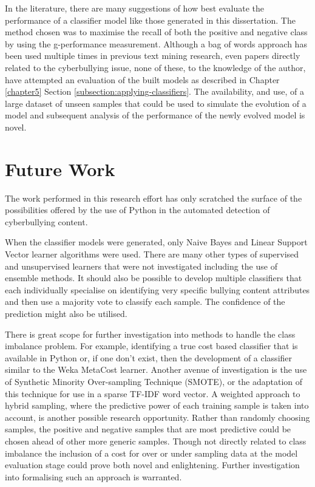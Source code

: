 In the literature, there are many suggestions of how best evaluate the performance of a classifier model like those generated in this dissertation. The method chosen was to maximise the recall of both the positive and negative class by using the g-performance measurement. Although a bag of words approach has been used multiple times in previous text mining research, even papers directly related to the cyberbullying issue, none of these, to the knowledge of the author, have attempted an evaluation of the built models as described in Chapter \ref{chapter5} Section \ref{subsection:applying-classifiers}. The availability, and use, of a large dataset of unseen samples that could be used to simulate the evolution of a model and subsequent analysis of the performance of the newly evolved model is novel.


\section{Future Work}

The work performed in this research effort has only scratched the surface of the possibilities offered by the use of Python in the automated detection of cyberbullying content.

When the classifier models were generated, only Naive Bayes and Linear Support Vector learner algorithms were used. There are many other types of supervised and unsupervised learners that were not investigated including the use of ensemble methods. It should also be possible to develop multiple classifiers that each individually specialise on identifying very specific bullying content attributes and then use a majority vote to classify each sample. The confidence of the prediction might also be utilised. 

There is great scope for further investigation into methods to handle the class imbalance problem. For example, identifying a true cost based classifier that is available in Python or, if one don't exist, then the development of a classifier similar to the Weka MetaCost learner. Another avenue of investigation is the use of Synthetic Minority Over-sampling Technique (SMOTE), or the adaptation of this technique for use in a sparse TF-IDF word vector. A weighted approach to hybrid sampling, where the predictive power of each training sample is taken into account, is another possible research opportunity. Rather than randomly choosing samples, the positive and negative samples that are most predictive could be chosen ahead of other more generic samples. Though not directly related to class imbalance the inclusion of a cost for over or under sampling data at the model evaluation stage could prove both novel and enlightening. Further investigation into formalising such an approach is warranted.

